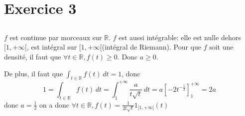 \documentclass[a4paper,12pt]{book}
\begin{document}
\section{Exercice 3}
\subsection{}
$f$ est continue par morceaux sur $\mathbb{R}$. $f$ est aussi intégrable: elle est nulle dehors $[1,+\infty[$, est intégral sur $[1,+\infty[$(intégral de Riemann). 
Pour que $f$ soit une densité, il faut que $\forall t \in \mathbb{R}, f(t) \geq 0$. 
Donc $a \geq 0$. 

De plus, il faut que $\int_{t \in \mathbb{R}} f(t)\,dt=1$, donc 
$$
1=\int_{t \in \mathbb{R}} f(t)\,dt=\int_1^{+\infty} \frac{a}{t\sqrt{t}}\,dt=a\left[-2t^{-\frac{1}{2}}\right]^{+\infty}_1=2a
$$
donc $\boxed{a=\frac{1}{2}}$
on a donc $\forall t \in \mathbb{R}, f(t)=\frac{1}{2t\sqrt{t}}1_{[1,+\infty[}(t)$
\end{document}
